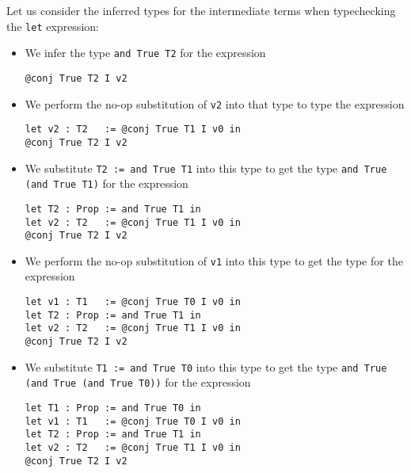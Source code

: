 \begin{prooftree}
\end{prooftree}

\begin{comment}
\begin{verbatim}
Γ ⊢ A type
Γ ⊢ y : A
Γ, x:A:=y ⊢ B type
Γ, x:A:=y ⊢ f : B
-------------------------------
Γ ⊢ (let x : A := y in f) : B[x/y]
\end{verbatim}
\end{comment}

Let us consider the inferred types for the intermediate terms when typechecking the \texttt{let} expression:
\begin{itemize}
  \item
  We infer the type \texttt{and True T2} for the expression
\begin{verbatim}
@conj True T2 I v2
\end{verbatim}
  \item
  We perform the no-op substitution of \texttt{v2} into that type to type the expression
\begin{verbatim}
let v2 : T2   := @conj True T1 I v0 in
@conj True T2 I v2
\end{verbatim}
  \item
  We substitute \texttt{T2 := and True T1} into this type to get the type \texttt{and True (and True T1)} for the expression
\begin{verbatim}
let T2 : Prop := and True T1 in
let v2 : T2   := @conj True T1 I v0 in
@conj True T2 I v2
\end{verbatim}
  \item
  We perform the no-op substitution of \texttt{v1} into this type to get the type for the expression
\begin{verbatim}
let v1 : T1   := @conj True T0 I v0 in
let T2 : Prop := and True T1 in
let v2 : T2   := @conj True T1 I v0 in
@conj True T2 I v2
\end{verbatim}
  \item
  We substitute \texttt{T1 := and True T0} into this type to get the type \texttt{and True (and True (and True T0))} for the expression
\begin{verbatim}
let T1 : Prop := and True T0 in
let v1 : T1   := @conj True T0 I v0 in
let T2 : Prop := and True T1 in
let v2 : T2   := @conj True T1 I v0 in
@conj True T2 I v2

\end{verbatim}
\end{itemize}
